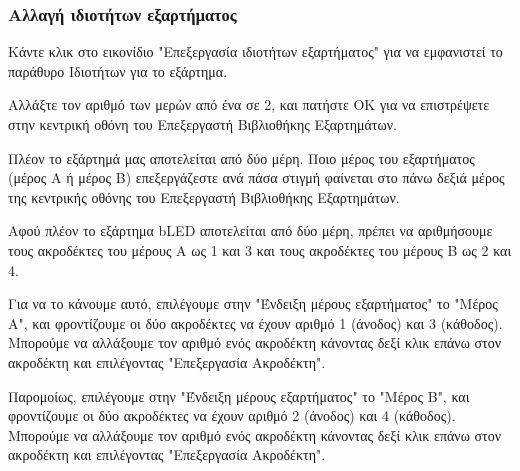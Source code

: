 \documentclass[a4paper]{article}
\begin{document}
\subsubsection{Αλλαγή ιδιοτήτων εξαρτήματος}
Κάντε κλικ στο εικονίδιο "Επεξεργασία ιδιοτήτων εξαρτήματος" %
για να εμφανιστεί το παράθυρο Ιδιοτήτων για το εξάρτημα. 

\begin{figure}
  \begin{center}
    \label{fig:kicad-main}
  \end{center}
\end{figure}

Αλλάξτε τον αριθμό των μερών από ένα σε 2, και πατήστε ΟΚ για να επιστρέψετε στην κεντρική οθόνη του Επεξεργαστή Βιβλιοθήκης Εξαρτημάτων.

Πλέον το εξάρτημά μας αποτελείται από δύο μέρη. Ποιο μέρος του εξαρτήματος (μέρος Α ή μέρος Β) επεξεργάζεστε ανά πάσα στιγμή φαίνεται στο πάνω δεξιά μέρος της κεντρικής οθόνης του Επεξεργαστή Βιβλιοθήκης Εξαρτημάτων.

\begin{figure}
  \begin{center}
    \label{fig:kicad-main}
  \end{center}
\end{figure}

Αφού πλέον το εξάρτημα b\textenglish{LED} αποτελείται από δύο μέρη, πρέπει να αριθμήσουμε τους ακροδέκτες του μέρους Α ως 1 και 3 και τους ακροδέκτες του μέρους Β ως 2 και 4.

Για να το κάνουμε αυτό, επιλέγουμε στην "Ένδειξη μέρους εξαρτήματος" το "Μέρος A", και φροντίζουμε οι δύο ακροδέκτες να έχουν αριθμό 1 (άνοδος) και 3 (κάθοδος). Μπορούμε να αλλάξουμε τον αριθμό ενός ακροδέκτη κάνοντας δεξί κλικ επάνω στον ακροδέκτη και επιλέγοντας "Επεξεργασία Ακροδέκτη".

Παρομοίως, επιλέγουμε στην "Ένδειξη μέρους εξαρτήματος" το "Μέρος B", και φροντίζουμε οι δύο ακροδέκτες να έχουν αριθμό 2 (άνοδος) και 4 (κάθοδος). Μπορούμε να αλλάξουμε τον αριθμό ενός ακροδέκτη κάνοντας δεξί κλικ επάνω στον ακροδέκτη και επιλέγοντας "Επεξεργασία Ακροδέκτη".

\begin{figure}
  \begin{center}
    \label{fig:kicad-main}
  \end{center}
\end{figure}
\end{document}
